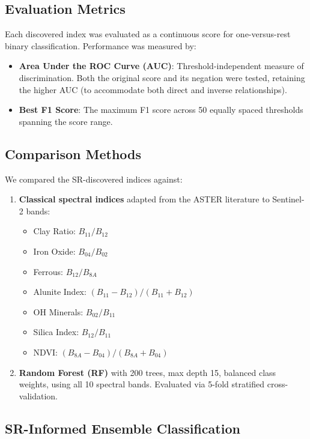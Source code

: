 \documentclass[preprint,authoryear,number]{elsarticle}
\begin{document}
\subsection{Evaluation Metrics}

Each discovered index was evaluated as a continuous score for one-versus-rest binary classification. Performance was measured by:

\begin{itemize}
  \item \textbf{Area Under the ROC Curve (AUC)}: Threshold-independent measure of discrimination. Both the original score and its negation were tested, retaining the higher AUC (to accommodate both direct and inverse relationships).
  \item \textbf{Best F1 Score}: The maximum F1 score across 50 equally spaced thresholds spanning the score range.
\end{itemize}

\subsection{Comparison Methods}

We compared the SR-discovered indices against:

\begin{enumerate}
  \item \textbf{Classical spectral indices} adapted from the ASTER literature to Sentinel-2 bands:
  \begin{itemize}
    \item Clay Ratio: $B_{11}/B_{12}$ \citep{Ninomiya2005}
    \item Iron Oxide: $B_{04}/B_{02}$ \citep{Sabins1999}
    \item Ferrous: $B_{12}/B_{8A}$
    \item Alunite Index: $(B_{11}-B_{12})/(B_{11}+B_{12})$
    \item OH Minerals: $B_{02}/B_{11}$
    \item Silica Index: $B_{12}/B_{11}$
    \item NDVI: $(B_{8A}-B_{04})/(B_{8A}+B_{04})$
  \end{itemize}
  \item \textbf{Random Forest (RF)} with 200 trees, max depth 15, balanced class weights, using all 10 spectral bands. Evaluated via 5-fold stratified cross-validation.
\end{enumerate}

\subsection{SR-Informed Ensemble Classification}
\label{sec:ensemble}
\end{document}
